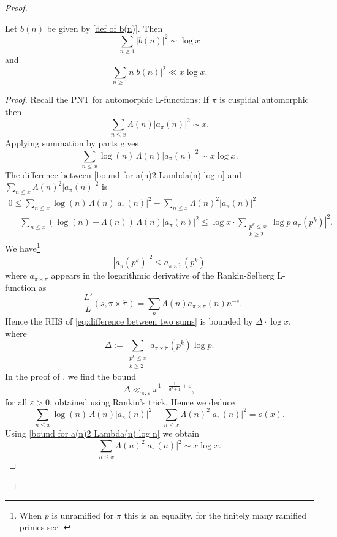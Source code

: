 \documentclass[12pt]{amsart}
\begin{document}
\begin{proof}
\begin{lem}
Let $b(n)$ be given by \eqref{def of b(n)}. Then 
\[
\sum_{n\geq 1} |b(n)|^2 \sim  \log x
\]
and 
\[
\sum_{n\geq 1}  n |b(n)|^2 \ll x\log x. 
\]
\end{lem}
\begin{proof}
 Recall the PNT for automorphic L-functions: If $\pi$ is cuspidal automorphic    then \cite[Lemma 5.1]{LiuWangYe}
\[
\sum_{n \leq x} \Lambda(n)|a_\pi(n)|^2 \sim x.
\]
Applying summation by parts gives
\begin{equation}\label{bound for a(n)2 Lambda(n) log n}
\sum_{n \leq x} \log(n) \, \Lambda(n)|a_\pi(n)|^2 \sim x \log x.
\end{equation}
The difference between \eqref{bound for a(n)2 Lambda(n) log n} and $\sum_{n \leq x} \Lambda(n)^2 |a_\pi(n)|^2$ is
\begin{multline}\label{eq:difference between two sums} 
0\leq \sum_{n \leq x} \log(n) \, \Lambda(n)|a_\pi(n)|^2 -\sum_{n \leq x} \Lambda(n)^2 |a_\pi(n)|^2 
\\
= \sum_{n \leq x} (\log(n)-\Lambda(n))  \, \Lambda(n)|a_\pi(n)|^2
\leq \log x \cdot   \sum_{\substack{ p^k\leq x\\k\geq 2}}  \log p |a_\pi(p^k)|^2 .
\end{multline}
We have\footnote{When $p$ is unramified for $\pi$ this is an equality, for the finitely many ramified primes see \cite[Lemma 2.2]{ST}.} 
$$
|a_\pi (p^k)|^2\leq a_{\pi \times \check{\pi}}(p^k)
$$ 
where $a_{\pi \times \check{\pi}}$ appears in  the  logarithmic derivative of the Rankin-Selberg L-function as
\[
-\frac{L'}{L}(s,\pi \times \check{\pi}) = \sum_n \Lambda(n)a_{\pi \times \check{\pi}}(n)n^{-s}.
\]
Hence the RHS of \eqref{eq:difference between two sums}  is bounded by $\Delta \cdot \log x$, where
\[
\Delta:=\sum_{\substack{p^k\leq x\\k\geq 2}} a_{\pi \times \check{\pi}}(p^k) \log p.
\]
In the proof of \cite[Theorem 8.1]{Jiang}, we find the bound 
\[
\Delta \ll_{\pi,\varepsilon} x^{1-\frac 1{d^2+1}+\varepsilon},
\] 
for all $\varepsilon>0$, obtained using Rankin's trick. Hence we deduce
\[
\sum_{n \leq x} \log(n) \, \Lambda(n)|a_\pi(n)|^2 -\sum_{n \leq x} \Lambda(n)^2 |a_\pi(n)|^2 =o(x).
\]
Using \eqref{bound for a(n)2 Lambda(n) log n} we obtain
\begin{equation}\label{eq:LWY and Jiang}
\sum_{n \leq x} \Lambda(n)^2 |a_\pi(n)|^2 \sim x\log x  .
\end{equation}


\end{proof}
\end{proof}
\end{document}
